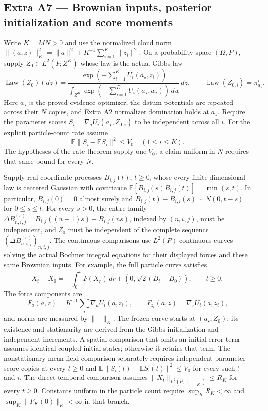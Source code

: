 \documentclass[11pt,a4paper]{report}
\begin{document}
\subsection{\texorpdfstring{Extra A7 — Brownian inputs, posterior initialization and score moments}{Extra A7 — Brownian inputs, posterior initialization and score moments}}


Write \(K=MN>0\) and use the normalized cloud norm \(\|(a,z)\|_K^2=\|a\|^2+K^{-1}\sum_{i=1}^K\|z_i\|^2\). On a probability space \((\Omega,P)\), supply \(Z_0\in L^2(P;Z^K)\) whose law is the actual Gibbs law
        \[\operatorname{Law}(Z_0)(dz)=
          \frac{\exp(-\sum_{i=1}^K U_i(a_\star,z_i))}{\int_{Z^K}\exp(-\sum_{i=1}^K U_i(a_\star,w_i))\,dw}\,dz,\qquad
          \operatorname{Law}(Z_{0,i})=\pi_{a_\star}^i.\]
        Here \(a_\star\) is the proved evidence optimizer, the datum potentials are repeated across their \(N\) copies, and Extra A2 normalizer domination holds at \(a_\star\). Require the parameter scores \(S_i=\nabla_aU_i(a_\star,Z_{0,i})\) to be independent across all \(i\). For the explicit particle-count rate assume
        \[\mathbb E\|S_i-\mathbb ES_i\|^2\le V_0\quad(1\le i\le K).\]
        The hypotheses of the rate theorem supply one \(V_0\); a claim uniform in \(N\) requires that same bound for every \(N\).




Supply real coordinate processes \(B_{i,j}(t)\), \(t\ge0\), whose every finite-dimensional law is centered Gaussian with covariance \(\mathbb E[B_{i,j}(s)B_{i,j}(t)]=\min(s,t)\). In particular, \(B_{i,j}(0)=0\) almost surely and \(B_{i,j}(t)-B_{i,j}(s)\sim N(0,t-s)\) for \(0\le s\le t\). For every \(s>0\), the entire family \(\Delta B_{n,i,j}^{(s)}=B_{i,j}((n+1)s)-B_{i,j}(ns)\), indexed by \((n,i,j)\), must be independent, and \(Z_0\) must be independent of the complete sequence \((\Delta B_{n,i,j}^{(s)})_{n,i,j}\). The continuous comparisons use \(L^2(P)\)-continuous curves solving the actual Bochner integral equations for their displayed forces and these same Brownian inputs. For example, the full particle curve satisfies
        \[X_t-X_0=-\int_0^t F(X_r)\,dr+
          (0,\sqrt2(B_t-B_0)),\qquad t\ge0,\]
        The force components are \[F_a(a,z)=K^{-1}\sum_i\nabla_aU_i(a,z_i),\qquad F_{z_i}(a,z)=\nabla_zU_i(a,z_i),\] and norms are measured by \(\|\cdot\|_K\). The frozen curve starts at \((a_\star,Z_0)\); its existence and stationarity are derived from the Gibbs initialization and independent increments. A spatial comparison that omits an initial-error term assumes identical coupled initial states; otherwise it retains that term. The nonstationary mean-field comparison separately requires independent parameter-score copies at every \(t\ge0\) and \(\mathbb E\|S_i(t)-\mathbb ES_i(t)\|^2\le V_0\) for every such \(t\) and \(i\). The direct temporal comparison assumes \(\|X_t\|_{L^2(P;\|\cdot\|_K)}\le R_K\) for every \(t\ge0\). Constants uniform in the particle count require \(\sup_KR_K<\infty\) and \(\sup_K\|F_K(0)\|_K<\infty\) in that branch.
\end{document}
